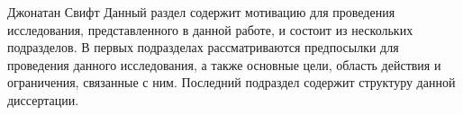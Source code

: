\hfill {}

\hfill Джонатан Свифт
Данный раздел содержит мотивацию для проведения исследования, представленного в данной работе, 
и состоит из нескольких подразделов.
В первых подразделах рассматриваются предпосылки для проведения данного исследования, а также 
основные цели, область действия и ограничения, связанные с ним.
Последний подраздел содержит структуру данной диссертации.
